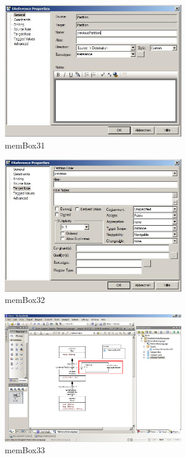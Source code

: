 \begin{figure}[!h]
	\centering
  \includegraphics[width=0.7\textwidth]{pics/memBox31.png}
	\caption{memBox31}
	\label{memBox31}
\end{figure}

\begin{figure}[!h]
	\centering
  \includegraphics[width=0.7\textwidth]{pics/memBox32.png}
	\caption{memBox32}
	\label{memBox32}
\end{figure}

\begin{figure}[!h]
	\centering
  \includegraphics[width=0.7\textwidth]{pics/memBox33.png}
	\caption{memBox33}
	\label{memBox33}
\end{figure}

